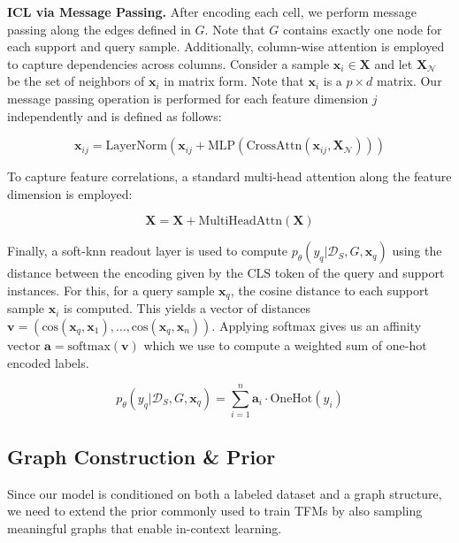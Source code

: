 \documentclass{article} %
\begin{document}
\textbf{ICL via Message Passing.} After encoding each cell, we perform message passing along the edges defined in $G$. Note that $G$ contains exactly one node for each support and query sample. Additionally, column-wise attention is employed to capture dependencies across columns. Consider a sample $\mathbf{x}_i \in \mathbf{X}$ and let $\mathbf{X}_{\mathcal{N}}$ be the set of neighbors of $\mathbf{x}_i$ in matrix form. Note that $\mathbf{x}_i$ is a $p \times d$ matrix. Our message passing operation is performed for each feature dimension $j$ independently and is defined as follows:

\begin{equation}
    \mathbf{x}_{i j} = \text{LayerNorm}(\mathbf{x}_{i j} + \text{MLP}(\text{CrossAttn}(\mathbf{x}_{i j}, \mathbf{X}_{\mathcal{N}})))
\end{equation}

To capture feature correlations, a standard multi-head attention along the feature dimension is employed:

\begin{equation}
    \mathbf{X} = \mathbf{X} + \text{MultiHeadAttn}(\mathbf{X})
\end{equation}

Finally, a soft-knn readout layer is used to compute $p_{\theta}(y_q | \mathcal{D}_S, G, \mathbf{x}_q)$ using the distance between the encoding given by the $\text{CLS}$ token of the query and support instances. For this, for a query sample $\mathbf{x}_q$, the cosine distance to each support sample $\mathbf{x}_i$ is computed. This yields a vector of distances $\mathbf{v} = (\text{cos}(\mathbf{x}_q, \mathbf{x}_1), \dots, \text{cos}(\mathbf{x}_q, \mathbf{x}_n))$. Applying softmax gives us an affinity vector $\mathbf{a} = \text{softmax}(\mathbf{v})$ which we use to compute a weighted sum of one-hot encoded labels.

\begin{equation}
    p_{\theta}(y_q | \mathcal{D}_S, G, \mathbf{x}_q) = \sum_{i=1}^n \mathbf{a}_i \cdot \text{OneHot}(y_i)
\end{equation}

\subsection{Graph Construction \& Prior}

Since our model is conditioned on both a labeled dataset and a graph structure, we need to extend the prior commonly used to train TFMs by also sampling meaningful graphs that enable in-context learning. 
\end{document}
